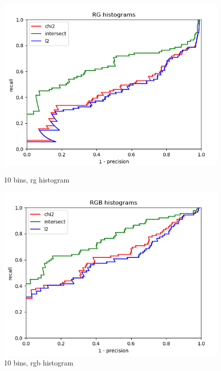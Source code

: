 \documentclass{article}
\begin{document}
\begin{figure}[ht]
    \centering
    \begin{minipage}{.5\textwidth}
        \includegraphics[width=\linewidth]{images/Q4.b-rg_histogram_10_bins.png}
        \cprotect\caption{10 bins, rg histogram}
    \end{minipage}\hfill
    \begin{minipage}{.5\textwidth}
        \includegraphics[width=\linewidth]{images/Q4.b-rgb_histogram_10_bins.png}
        \cprotect\caption{10 bins, rgb histogram}
    \end{minipage}
    \begin{minipage}{.5\textwidth}

\end{minipage}
\end{figure}
\end{document}
